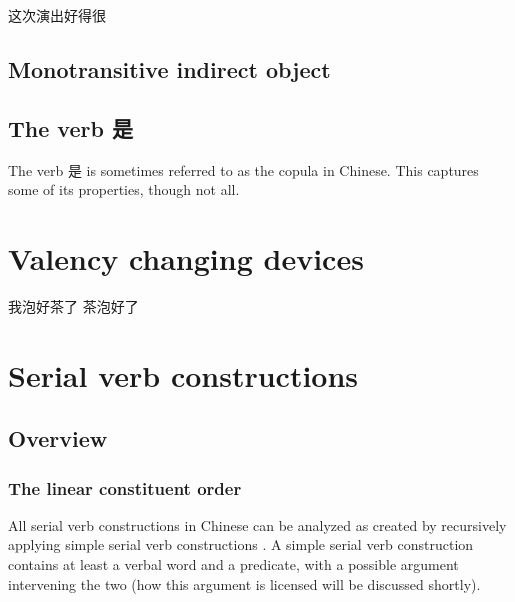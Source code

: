 \documentclass[UTF8, a4paper, oneside, scheme=plain]{ctexart}
\newcommand*{\citesec}[1]{\S~{#1}}
\begin{document}

\begin{exe}
    \ex 这次演出好得很
\end{exe}

\subsection{Monotransitive indirect object}

\subsection{The verb 是}

The verb 是 is sometimes referred to as the copula in Chinese.
This captures some of its properties,
though not all. 

\citet[7.8]{zhudexigrammar}

\section{Valency changing devices}\label{sec:valency-changing}

\begin{exe}
    \ex 我泡好茶了
    \ex 茶泡好了
\end{exe}

\section{Serial verb constructions}

\subsection{Overview}

\subsubsection{The linear constituent order}

All serial verb constructions in Chinese can be analyzed as 
created by recursively applying simple serial verb constructions
\citep[\citesec{12.1.4}]{zhudexigrammar}.
A simple serial verb construction contains 
at least a verbal word and a predicate,
with a possible argument intervening the two
(how this argument is licensed will be discussed shortly).
\end{document}
